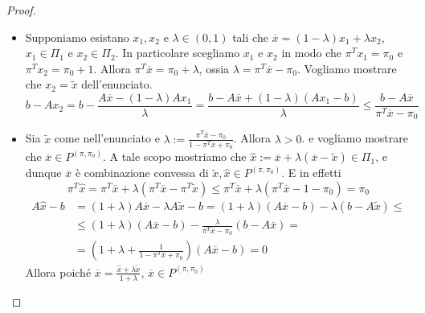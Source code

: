 \begin{proof}\( \)
\begin{itemize}
    \item[\(\implies \)] Supponiamo esistano \(x_{1}, x_{2}\) e \(\lambda \in
        {(0, 1)}\) tali che \(\overline{x} = {(1 - \lambda)} x_{1} +
        \lambda x_{2}\), \(x_{1} \in \Pi_{1}\) e \(x_{2} \in \Pi_{2}\). In
        particolare scegliamo \(x_{1}\) e \(x_{2}\) in modo che \(\pi^{T}x_{1} =
        \pi_{0}\) e \(\pi^{T}x_{2} = \pi_{0} + 1\). Allora \(\pi^{T}\overline{x}
        = \pi_{0} + \lambda\), ossia \(\lambda = \pi^{T}\overline{x} -
        \pi_{0}\). Vogliamo mostrare che \(x_{2} = \tilde{x}\) dell'enunciato.
        \[
          b - Ax_{2} = b - \frac{A \overline{x} - {(1 - \lambda)}A
          x_{1}}{\lambda} = \frac{b - A\overline{x} + {(1 - \lambda)}{(Ax_{1} -
          b)}}{\lambda} \le \frac{b - A\overline{x}}{\pi^{T}\overline{x} - \pi_{0}}
        \]
    \item[\(\impliedby \)] Sia \(\tilde{x}\) come nell'enunciato e \(\lambda :=
        \frac{\pi^{T}{\overline{x}} - \pi_{0}}{1 - \pi^{T}\overline{x} +
    \pi_{0}}\). Allora \(\lambda > 0\). e vogliamo mostrare che \(\overline{x}
    \in P^{{(\pi, \pi_{0})}}\). A tale scopo mostriamo che \(\widehat{x} :=
    \overline{x} + \lambda{(\overline{x} - \tilde{x})} \in \Pi_{1}\), e dunque
    \(\overline{x}\) è combinazione convessa di \(\tilde{x}, \widehat{x} \in
    P^{{(\pi, \pi_{0})}}\). E in effetti
    \[
      \pi^{T}\widehat{x} = \pi^{T}\overline{x} + \lambda {(\pi^{T}\overline{x} -
      \pi^{T}\tilde{x})} \le \pi^{T}\overline{x} + \lambda {(\pi^{T}\overline{x}
      - 1 - \pi_{0})} = \pi_{0}
    \]
    \begin{align*}
        A\widehat{x} - b &= {(1 + \lambda)}A \overline{x} - \lambda A\tilde{x} - b
      = {(1 + \lambda)}{(A\overline{x} - b)} - \lambda {(b - A\tilde{x})} \le \\
         &\le {(1 + \lambda)}{(A\overline{x} - b)} -
         \frac{\lambda}{\pi^{T}\overline{x} - \pi_{0}}{(b - A\overline{x})} = \\
     &= {\left( 1 + \lambda + \frac{1}{1 - \pi^{T}\overline{x} + \pi_{0}} \right)} 
     {(A\overline{x} - b)} = 0
    \end{align*}
    Allora poiché \(\overline{x} = \frac{\widehat{x} + \lambda \tilde{x}}{1 +
    \lambda}\), \(\overline{x} \in P^{{(\pi, \pi_{0})}}\) 
\end{itemize}
\end{proof}

\begin{theorem}{}
    
\end{theorem}






